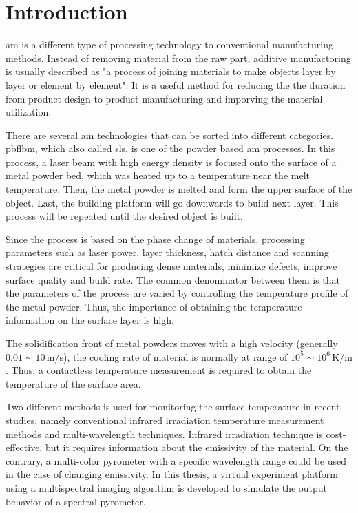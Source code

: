 \glsresetall%
\chapter{Introduction}%

\gls{am} is a different type of processing technology to conventional 
manufacturing methods. Instead of removing material from the raw part, 
additive manufactoring is usually described as "a process of joining materials
to make objects layer by layer or element by element"\cite{Frazier.2014}.
It is a useful method for reducing the the duration from product design 
to product manufacturing and imporving the material 
utilization\cite{Swift.2013b}. 


There are several \gls{am} technologies that can be sorted into different 
categories. \gls{pbflbm}, which also called \gls{sls}, is one of the powder 
based \gls{am} processes\cite{Kruth.1991}. In this process, a laser beam 
with high energy density is focused onto the surface of a metal powder bed, 
which was heated up to a temperature near the melt temperature. Then, the 
metal powder is melted and form the upper surface of the object. Last, the 
building platform will go downwards to build next layer. This process will be 
repeated until the desired object is built\cite{RevillaLeon.2019}.


Since the process is based on the phase change of materials, processing parameters 
such as laser power, layer thickness, hatch distance and scanning strategies 
are critical for producing dense materials, minimize defects, improve 
surface quality and build rate\cite{Oliveira.2020}. The common 
denominator between them is that the parameters of the process 
are varied by controlling the temperature profile of the metal powder\cite{Swift.2013b}. 
Thus, the importance of obtaining the temperature information on 
the surface layer is high. 


The solidification front of metal powders moves with a high velocity (generally 
$0.01 \sim 10 \, \text{m/s}$)\cite{DebRoy.2018}, the cooling rate of material 
is normally at range of $10^5 \sim 10^6 \, \text{K/m}$\cite{Oliveira.2020}. 
Thus, a contactless temperature measurement is required to obtain the temperature 
of the surface area. 


Two different methods is used for monitoring the surface temperature 
in recent studies, namely conventional infrared irradiation 
temperature measurement methods and multi-wavelength techniques\cite{Li.2019}.
Infrared irradiation technique is cost-effective, but it requires information 
about the emissivity of the material\cite{Hagqvist.2013}. On the contrary, a multi-color 
pyrometer with a specific wavelength range could be used in the case of changing 
emissivity\cite{Pixner.2021}. In this thesis, a virtual experiment platform 
using a multispectral imaging algorithm 
is developed to simulate the output behavior of a spectral pyrometer.


